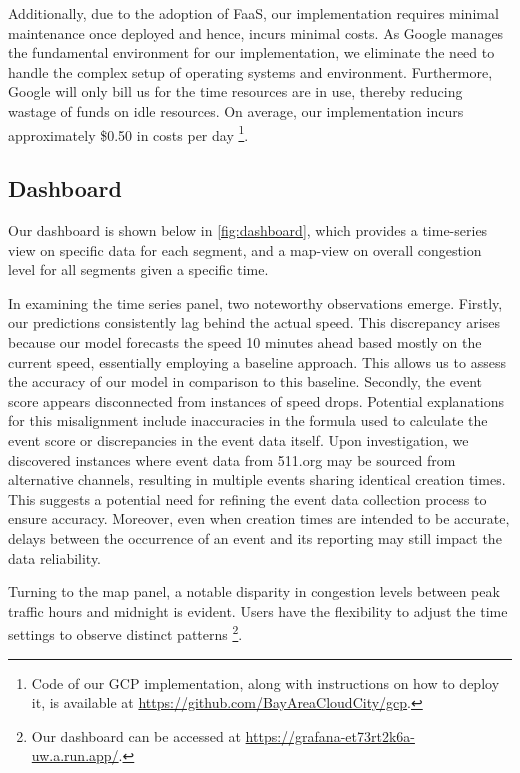 Additionally, due to the adoption of FaaS, our implementation requires minimal maintenance once deployed and hence, incurs minimal costs. As Google manages the fundamental environment for our implementation, we eliminate the need to handle the complex setup of operating systems and environment. Furthermore, Google will only bill us for the time resources are in use, thereby reducing wastage of funds on idle resources. On average, our implementation incurs approximately \$0.50 in costs per day \footnote{Code of our GCP implementation, along with instructions on how to deploy it, is available at \url{https://github.com/BayAreaCloudCity/gcp}.}.

\subsection{Dashboard}
Our dashboard is shown below in  \autoref{fig:dashboard}, which provides a time-series view on specific data for each segment, and a map-view on overall congestion level for all segments given a specific time.

In examining the time series panel, two noteworthy observations emerge. Firstly, our predictions consistently lag behind the actual speed. This discrepancy arises because our model forecasts the speed 10 minutes ahead based mostly on the current speed, essentially employing a baseline approach. This allows us to assess the accuracy of our model in comparison to this baseline. Secondly, the event score appears disconnected from instances of speed drops. Potential explanations for this misalignment include inaccuracies in the formula used to calculate the event score or discrepancies in the event data itself. Upon investigation, we discovered instances where event data from 511.org may be sourced from alternative channels, resulting in multiple events sharing identical creation times. This suggests a potential need for refining the event data collection process to ensure accuracy. Moreover, even when creation times are intended to be accurate, delays between the occurrence of an event and its reporting may still impact the data reliability.

Turning to the map panel, a notable disparity in congestion levels between peak traffic hours and midnight is evident. Users have the flexibility to adjust the time settings to observe distinct patterns \footnote{Our dashboard can be accessed at \url{https://grafana-et73rt2k6a-uw.a.run.app/}.}. 

